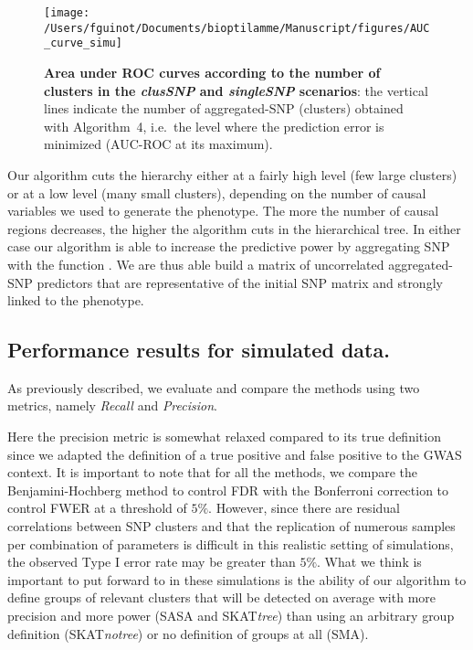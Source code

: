 \documentclass[]{book}
\begin{document}
\begin{figure}

{\centering \texttt{[image: /Users/fguinot/Documents/bioptilamme/Manuscript/figures/AUC\_curve\_simu]} 

}

\caption{\textbf{Area under ROC curves according to the number of clusters in the \emph{clusSNP} and \emph{singleSNP} scenarios}: the vertical lines indicate the number of aggregated-SNP (clusters) obtained with Algorithm~4, i.e.~the level where the prediction error is minimized (AUC-ROC at its maximum).}\label{fig:AUCcurvesimu}
\end{figure}

Our algorithm cuts the hierarchy either at a fairly high level (few
large clusters) or at a low level (many small clusters), depending on
the number of causal variables we used to generate the phenotype. The
more the number of causal regions decreases, the higher the algorithm
cuts in the hierarchical tree. In either case our algorithm is able to
increase the predictive power by aggregating SNP with the function . We
are thus able build a matrix of uncorrelated aggregated-SNP predictors
that are representative of the initial SNP matrix and strongly linked to
the phenotype.

\hypertarget{performance-results-for-simulated-data.}{%
\subsection{Performance results for simulated data.}\label{performance-results-for-simulated-data.}}

As previously described, we evaluate and compare the methods using two
metrics, namely \emph{Recall} and \emph{Precision}.

Here the precision metric is somewhat relaxed compared to its true
definition since we adapted the definition of a true positive and false
positive to the GWAS context. It is important to note that for all the
methods, we compare the Benjamini-Hochberg method to control FDR with
the Bonferroni correction to control FWER at a threshold of \(5\%\).
However, since there are residual correlations between SNP clusters and
that the replication of numerous samples per combination of parameters
is difficult in this realistic setting of simulations, the observed Type
I error rate may be greater than \(5\%\). What we think is important to
put forward to in these simulations is the ability of our algorithm to
define groups of relevant clusters that will be detected on average with
more precision and more power (SASA and SKAT\emph{tree}) than using an
arbitrary group definition (SKAT\emph{notree}) or no definition of groups at
all (SMA).
\end{document}
